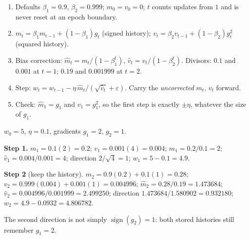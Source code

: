 \documentclass[11pt]{article}
\newcommand{\method}[1]{\begin{keyidea}[The method: #1]}
\newcommand{\sgn}{\operatorname{sign}}
\begin{document}
\method{Adam by hand}
\begin{enumerate}
  \item Defaults $\beta_1 = 0.9$, $\beta_2 = 0.999$; $m_0 = v_0 = 0$; $t$
    counts updates from $1$ and is never reset at an epoch boundary.
  \item $m_t = \beta_1 m_{t-1} + (1-\beta_1) g_t$ (signed history);
    $v_t = \beta_2 v_{t-1} + (1-\beta_2) g_t^2$ (squared history).
  \item Bias correction: $\hat m_t = m_t/(1 - \beta_1^t)$,
    $\hat v_t = v_t/(1 - \beta_2^t)$. Divisors: $0.1$ and $0.001$ at $t = 1$;
    $0.19$ and $0.001999$ at $t = 2$.
  \item Step: $w_t = w_{t-1} - \eta\,\hat m_t/(\sqrt{\hat v_t} + \varepsilon)$.
    Carry the \emph{uncorrected} $m_t$, $v_t$ forward.
  \item Check: $\hat m_1 = g_1$ and $\hat v_1 = g_1^2$, so the first step is
    exactly $\pm\eta$, whatever the size of $g_1$.
\end{enumerate}
\end{keyidea}

\begin{worked}
$w_0 = 5$, $\eta = 0.1$, gradients $g_1 = 2$, $g_2 = 1$.

\textbf{Step 1.} $m_1 = 0.1(2) = 0.2$; $v_1 = 0.001(4) = 0.004$;
$\hat m_1 = 0.2/0.1 = 2$; $\hat v_1 = 0.004/0.001 = 4$; direction
$2/\sqrt4 = 1$; $w_1 = 5 - 0.1 = 4.9$.

\textbf{Step 2} (keep the history). $m_2 = 0.9(0.2) + 0.1(1) = 0.28$;
$v_2 = 0.999(0.004) + 0.001(1) = 0.004996$;
$\hat m_2 = 0.28/0.19 = 1.473684$; $\hat v_2 = 0.004996/0.001999 = 2.499250$;
direction $1.473684/1.580902 = 0.932180$; $w_2 = 4.9 - 0.0932 = 4.806782$.

The second direction is not simply $\sgn(g_2) = 1$: both stored histories
still remember $g_1 = 2$.
\end{worked}
\end{document}
